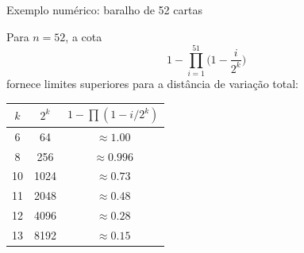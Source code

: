 \documentclass{beamer}
\begin{document}
\begin{frame}{Exemplo numérico: baralho de 52 cartas}
  
  Para $n = 52$, a cota
  \[
    1 - \prod_{i=1}^{51}\Big(1 - \frac{i}{2^k}\Big)
  \]
  fornece limites superiores para a distância de variação total:
  
  \begin{center}
    \begin{tabular}{ccc}
      $k$ & $2^k$ & $1 - \prod(1 - i/2^k)$ \\ \hline
      6 & 64 & $\approx 1.00$ \\
      8 & 256 & $\approx 0.996$ \\
      10 & 1024 & $\approx 0.73$ \\
      11 & 2048 & $\approx 0.48$ \\
      12 & 4096 & $\approx 0.28$ \\
      13 & 8192 & $\approx 0.15$ \\
    \end{tabular}
  \end{center}
  
\end{frame}
\end{document}
